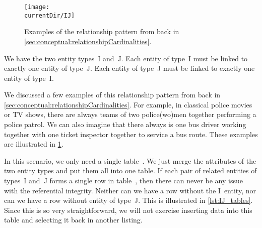 %
%
\label{sec:rm:ij}%
%
\begin{figure}%
\centering%
\texttt{[image: \\currentDir/IJ]}%
\caption{Examples of the  relationship pattern from back in \cref{sec:conceptual:relationshipCardinalities}.}%
\label{fig:rm:ij}%
\end{figure}%
%
%
%
We have the two entity types~I and~J.
Each entity of type~I must be linked to exactly one entity of type~J.
Each entity of type~J must be linked to exactly one entity of type~I.

We discussed a few examples of this relationship pattern from back in \cref{sec:conceptual:relationshipCardinalities}.
For example, in classical police movies or TV shows, there are always teams of two police(wo)men together performing a police patrol.
We can also imagine that there always is one bus driver working together with one ticket inspector together to service a bus route.
These examples are illustrated in \cref{fig:rm:ij}.

In this scenario, we only need a single table~\cite{S2024D:MEDTRDM}.
We just merge the attributes of the two entity types and put them all into one table.
If each pair of related entities of types~I and~J forms a single row in table~, then there can never be any issue with the referential integrity.
Neither can we have a row without the I~entity, nor can we have a row without entity of type~J.
This is illustrated in \cref{lst:IJ_tables}.
Since this is so very straightforward, we will not exercise inserting data into this table and selecting it back in another listing.%
%
\FloatBarrier%
\endhsection%
%
